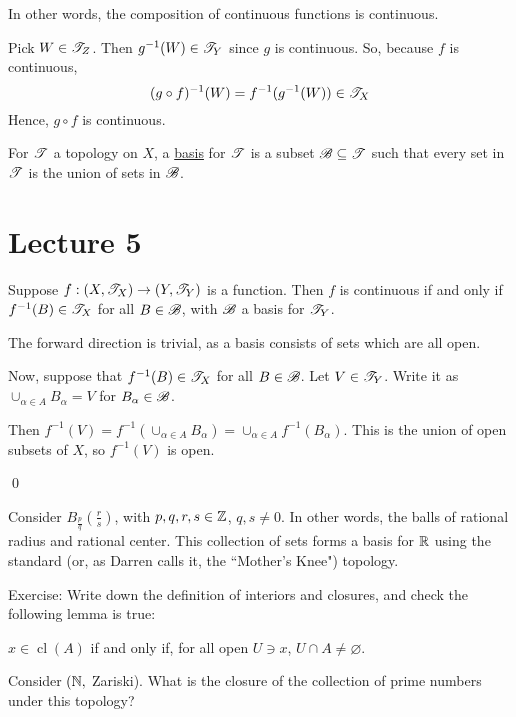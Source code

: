 \documentclass[x11names,reqno,14pt]{extarticle}
\DeclareMathOperator{\cl}{cl}
\begin{document}
In other words, the composition of continuous functions is continuous. 

\proof

Pick $W \in \mathscr{T}_Z$. Then $g^{-1}(W) \in \mathscr{T}_Y$ since $g$ is continuous. So, because $f$ is continuous, 
\[
(g\circ f)^{-1}(W) = f^{-1}(g^{-1}(W)) \in\mathscr{T}_X
\]
Hence, $g \circ f$ is continuous. 


For $\mathscr{T}$ a topology on $X$, a \underline{basis} for $\mathscr{T}$ is a subset $\mathscr{B}\subseteq\mathscr{T}$ such that every set in $\mathscr{T}$ is the union of sets in $\mathscr{B}$. 

\section*{Lecture 5}

\prop

Suppose $f:(X, \mathscr{T}_X) \to (Y, \mathscr{T}_Y)$ is a function. Then $f$ is continuous if and only if $f^{-1}(B) \in \mathscr{T}_X$ for all $B \in \mathscr{B}$, with $\mathscr{B}$ a basis for $\mathscr{T}_Y$.

\proof

The forward direction is trivial, as a basis consists of sets which are all open. 

Now, suppose that $f^{-1}(B) \in \mathscr{T}_X$ for all $B \in \mathscr{B}$. Let $V\in \mathscr{T}_Y$. Write it as $\cup_{\alpha\in A}B_\alpha = V$ for $B_{\alpha}\in \mathscr{B}$. 

Then $f^{-1}(V) = f^{-1}(\cup_{\alpha\in A}B_\alpha) = \cup_{\alpha\in A}f^{-1}(B_\alpha)$. This is the union of open subsets of $X$, so $f^{-1}(V)$ is open. 

\qed

\exm

Consider $B_{\frac{p}{q}}(\frac{r}{s})$, with $p, q, r, s \in \mathbb{Z}$, $q, s \neq 0$. In other words, the balls of rational radius and rational center. This collection of sets forms a basis for $\mathbb{R}$ using the standard (or, as Darren calls it, the ``Mother's Knee") topology. 

Exercise: Write down the definition of interiors and closures, and check the following lemma is true: 

\lem 

$x \in \cl(A)$ if and only if, for all open $U \ni x$, $U\cap A \neq \varnothing$. 

\exm

Consider $(\mathbb{N},$ Zariski). What is the closure of the collection of prime numbers under this topology? 
\end{document}
